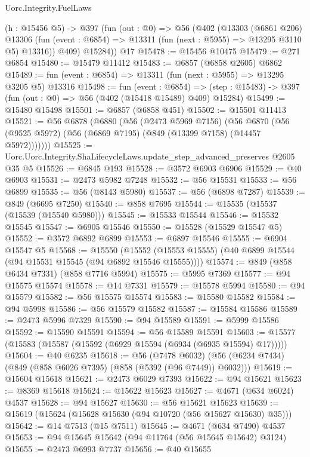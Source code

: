 \begin{lexlean}{Uorc.Integrity.FuelLaws}
\begin{coremodule}
    (h : @15456 @5) ->
    @397
      (fun (out : @0) =>
      @56
        (@402
          (@13303
            (@6861 @206)
            @13306
            (fun (event : @6854) => @13311 (fun (next : @5955) => @13295 @3110 @5) @13316))
          @409)
        @15284))
    @17
@15478 := @15456 @10475
@15479 := @271 @6854
@15480 := @15479 @11412
@15483 := @6857 (@6858 @2605) @6862
@15489 := fun (event : @6854) => @13311 (fun (next : @5955) => @13295 @3205 @5) @13316
@15498 := fun (event : @6854) =>
  (step : @15483) -> @397 (fun (out : @0) => @56 (@402 (@15418 @15489) @409) @15284)
@15499 := @15480 @15498
@15501 := @6857 (@6858 @451)
@15502 := @15501 @11413
@15521 := @56
    @6878
    (@6880
      (@56
        (@2473 @5969 @7156)
        (@56 @6870 (@56 (@9525 @5972) (@56 (@6869 @7195) (@849 (@13399 @7158) (@14457 @5972)))))))
@15525 := Uorc.Uorc.Integrity.ShaLifecycleLaws.update_step_advanced_preserves @2605 @35 @5
@15526 := @6845 @193
@15528 := @3572 @6903 @6906
@15529 := @40 @6903
@15531 := @2473 @5982 @7248
@15532 := @56 @15531
@15533 := @56 @6899
@15535 := @56 (@8143 @5980)
@15537 := @56 (@6898 @7287)
@15539 := @849 (@6695 @7250)
@15540 := @858 @7695
@15544 := @15535 (@15537 (@15539 (@15540 @5980)))
@15545 := @15533 @15544
@15546 := @15532 @15545
@15547 := @6905 @15546
@15550 := @15528 (@15529 @15547 @5)
@15552 := @3572 @6892 @6899
@15553 := @6897 @15546
@15555 := @6904 @15547 @5
@15568 := @15550
    (@15552 (@15553 @15555) (@40 @6899 @15544 (@94 @15531 @15545 (@94 @6892 @15546 @15555))))
@15574 := @849 (@858 @6434 @7331) (@858 @7716 @5994)
@15575 := @5995 @7369
@15577 := @94 @15575 @15574
@15578 := @14 @7331
@15579 := @15578 @5994
@15580 := @94 @15579
@15582 := @56 @15575 @15574
@15583 := @15580 @15582
@15584 := @94 @5998
@15586 := @56 @15579 @15582
@15587 := @15584 @15586
@15589 := @2473 @5996 @7329
@15590 := @94 @15589
@15591 := @5999 @15586
@15592 := @15590 @15591
@15594 := @56 @15589 @15591
@15603 := @15577 (@15583 (@15587 (@15592 (@6929 @15594 (@6934 (@6935 @15594) @17)))))
@15604 := @40 @6235
@15618 := @56
    (@7478 @6032)
    (@56 (@6234 @7434) (@849 (@858 @6026 @7395) (@858 (@5392 (@96 @7449)) @6032)))
@15619 := @15604 @15618
@15621 := @2473 @6029 @7393
@15622 := @94 @15621
@15623 := @8369 @15618
@15624 := @15622 @15623
@15627 := @4671 (@634 @6024) @4537
@15628 := @94 @15627
@15630 := @56 @15621 @15623
@15639 := @15619 (@15624 (@15628 @15630 (@94 @10720 (@56 @15627 @15630) @35)))
@15642 := @14 @7513 (@15 @7511)
@15645 := @4671 (@634 @7490) @4537
@15653 := @94 @15645 @15642 (@94 @11764 (@56 @15645 @15642) @3124)
@15655 := @2473 @6993 @7737
@15656 := @40 @15655

\end{coremodule}
\end{lexlean}
